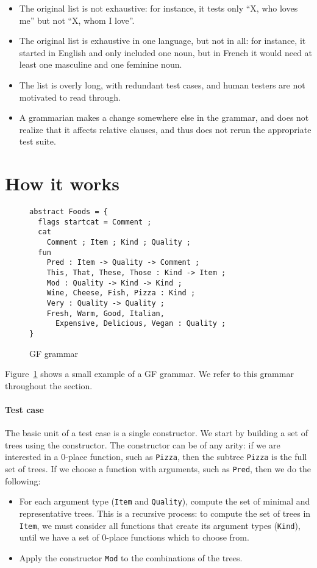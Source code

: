 \documentclass[11pt]{article}
\def\t#1{\texttt{#1}}
\begin{document}
\begin{itemize}
\item The original list is not exhaustive: for instance, it tests only
``X, who loves me'' but not ``X, whom I love''. 
\item The original list is exhaustive in one language, but not in all:
for instance, it started in English and only included one noun, but in
French it would need at least one masculine and one feminine noun. 
\item The list is overly long, with redundant test cases, and human
testers are not motivated to read through. 
\item A grammarian makes a change somewhere else in the grammar, and
does not realize that it affects relative clauses, and thus does not
rerun the appropriate test suite. 
\end{itemize}

\section{How it works}


\begin{figure}[h]

  \centering
    \begin{verbatim}
abstract Foods = {
  flags startcat = Comment ;
  cat
    Comment ; Item ; Kind ; Quality ;
  fun
    Pred : Item -> Quality -> Comment ;
    This, That, These, Those : Kind -> Item ;
    Mod : Quality -> Kind -> Kind ;
    Wine, Cheese, Fish, Pizza : Kind ;
    Very : Quality -> Quality ;
    Fresh, Warm, Good, Italian, 
      Expensive, Delicious, Vegan : Quality ;
}
    \end{verbatim}
  \caption{GF grammar}
\label{fig:exampleGrammar}
\end{figure}

Figure~\ref{fig:exampleGrammar} shows a small example of a GF
grammar. We refer to this grammar throughout the section. 

\paragraph{Test case} 
The basic unit of a test case is a single constructor. 
We start by building a set of trees using the constructor.
The constructor can be of any arity: if we are interested in a 0-place
function, such as \t{Pizza}, then the subtree \t{Pizza} is the full
set of trees. If we choose a function with arguments, such as
\t{Pred}, then we do the following: 
\begin{itemize}
\item For each argument type (\t{Item} and \t{Quality}), compute the
  set of minimal and representative trees. This is a recursive
  process: to compute the set of trees in \t{Item}, we must consider
  all functions that create its argument types (\t{Kind}), until we
  have a set of 0-place functions which to choose from. 
\item Apply the constructor \t{Mod} to the combinations of the trees.
\end{itemize}
\end{document}
